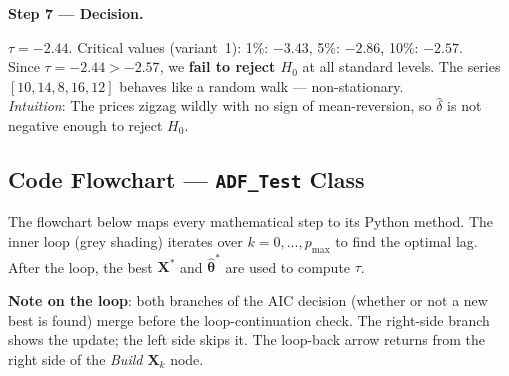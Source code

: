 \documentclass[10pt,a4paper,twocolumn]{article}
\begin{document}
\noindent\textbf{Step 7 --- Decision.}
\begin{tcolorbox}[resultbox={Worked Example Result}]
$\tau = -2.44$.  Critical values (variant~1): 1\%: $-3.43$,
5\%: $-2.86$, 10\%: $-2.57$.\\[2pt]
Since $\tau = -2.44 > -2.57$, we \textbf{fail to reject $H_0$} at
all standard levels.  The series $[10,14,8,16,12]$ behaves like a
random walk --- non-stationary.\\[2pt]
\textit{Intuition}: The prices zigzag wildly with no sign of
mean-reversion, so $\hat\delta$ is not negative enough to reject $H_0$.
\end{tcolorbox}

\subsection{Code Flowchart --- \texttt{ADF\_Test} Class}

The flowchart below maps every mathematical step to its Python
method.  The inner loop (grey shading) iterates over
$k=0,\ldots,p_{\max}$ to find the optimal lag.  After the loop, the
best $\mathbf{X}^*$ and $\hat{\boldsymbol\theta}^*$ are used to
compute $\tau$.

\noindent\textbf{Note on the loop}: both branches of the AIC
decision (whether or not a new best is found) merge before the
loop-continuation check.  The right-side branch shows the update;
the left side skips it.  The loop-back arrow returns from the right
side of the \emph{Build $\mathbf{X}_k$} node.
\end{document}
